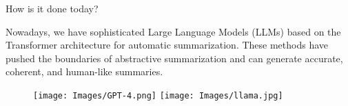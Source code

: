 		\begin{frame}{How is it done today?}

			Nowadays, we have sophisticated Large Language Models (LLMs) based on the
			Transformer architecture \citep{vaswani2017attention} for automatic summarization.
			These methods have pushed the boundaries of abstractive summarization and can
			generate accurate, coherent, and human-like summaries.

			\vskip 1.3cm

			\begin{figure}
				\centering
				\texttt{[image: Images/GPT-4.png]}
				\hskip 1cm
				\texttt{[image: Images/llama.jpg]}
			\end{figure}

		\end{frame}
